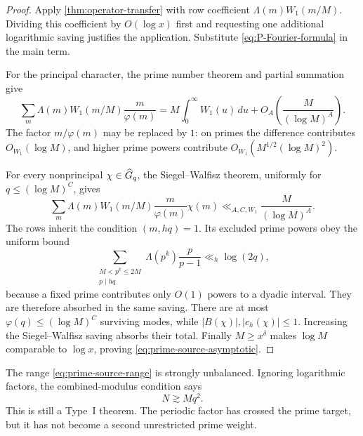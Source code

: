 \begin{proof}
Apply \cref{thm:operator-transfer} with row coefficient
$\Lambda(m)W_1(m/M)$.  Dividing this coefficient by $O(\log x)$ first and
requesting one additional logarithmic saving justifies the application.
Substitute \eqref{eq:P-Fourier-formula} in the main term.

For the principal character, the prime number theorem and partial summation
give
\begin{equation}\label{eq:principal-prime-source}
 \sum_m\Lambda(m)W_1(m/M)\frac{m}{\varphi(m)}
 =M\int_0^\infty W_1(u)\,du
 +O_A\!\left(\frac{M}{(\log M)^A}\right).
\end{equation}
The factor $m/\varphi(m)$ may be replaced by $1$: on primes the difference
contributes $O_{W_1}(\log M)$, and higher prime powers contribute
$O_{W_1}(M^{1/2}(\log M)^2)$.

For every nonprincipal $\chi\in\widehat G_q$, the Siegel--Walfisz theorem,
uniformly for $q\leq(\log M)^C$, gives
\begin{equation}\label{eq:nonprincipal-prime-source}
 \sum_m\Lambda(m)W_1(m/M)\frac{m}{\varphi(m)}\chi(m)
 \ll_{A,C,W_1}\frac{M}{(\log M)^A}.
\end{equation}
The rows inherit the condition $(m,hq)=1$.  Its excluded prime powers obey
the uniform bound
\begin{equation}\label{eq:excluded-prime-source-powers}
 \sum_{\substack{M<p^k\leq2M\\p\mid hq}}
 \Lambda(p^k)\frac{p}{p-1}
 \ll_h\log(2q),
\end{equation}
because a fixed prime contributes only $O(1)$ powers to a dyadic interval.
They are therefore absorbed in the same saving.  There are at most
$\varphi(q)\leq(\log M)^C$
surviving modes, while $|B(\chi)|,|c_h(\chi)|\leq1$.  Increasing the
Siegel--Walfisz saving absorbs their total.  Finally
$M\geq x^\delta$ makes $\log M$ comparable to $\log x$, proving
\eqref{eq:prime-source-asymptotic}.
\end{proof}

The range \eqref{eq:prime-source-range} is strongly unbalanced.  Ignoring
logarithmic factors, the combined-modulus condition says
\begin{equation}\label{eq:type-I-imbalance}
 N\gtrsim Mq^2.
\end{equation}
This is still a Type~I theorem.  The periodic factor has crossed the prime
target, but it has not become a second unrestricted prime weight.

